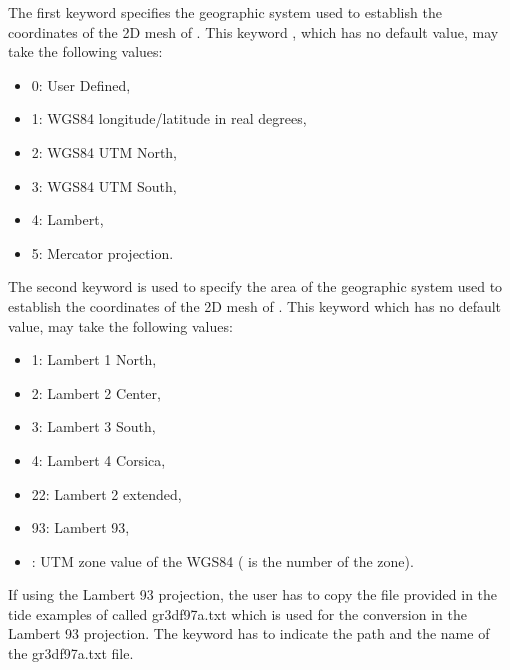 The first keyword specifies the geographic system used to establish the
coordinates of the 2D mesh of .
This keyword , which has no default value,
may take the following values:

\begin{itemize}
\item 0: User Defined,

\item 1: WGS84 longitude/latitude in real degrees,

\item 2: WGS84 UTM North,

\item 3: WGS84 UTM South,

\item 4: Lambert,

\item 5: Mercator projection.
\end{itemize}

The second keyword is used to specify the area of the geographic system used
to establish the coordinates of the 2D mesh of .
This keyword  which has no default
value, may take the following values:

\begin{itemize}
\item 1: Lambert 1 North,

\item 2: Lambert 2 Center,

\item 3: Lambert 3 South,

\item 4: Lambert 4 Corsica,

\item 22: Lambert 2 extended,

\item 93: Lambert 93,

\item {}: UTM zone value of the WGS84 (
is the number of the zone).
\end{itemize}

If using the Lambert 93 projection, the user has to copy the file provided
in the tide examples of  called gr3df97a.txt which is used
for the conversion in the Lambert 93 projection.
The keyword  has to indicate the path
and the name of the gr3df97a.txt file.
\\

